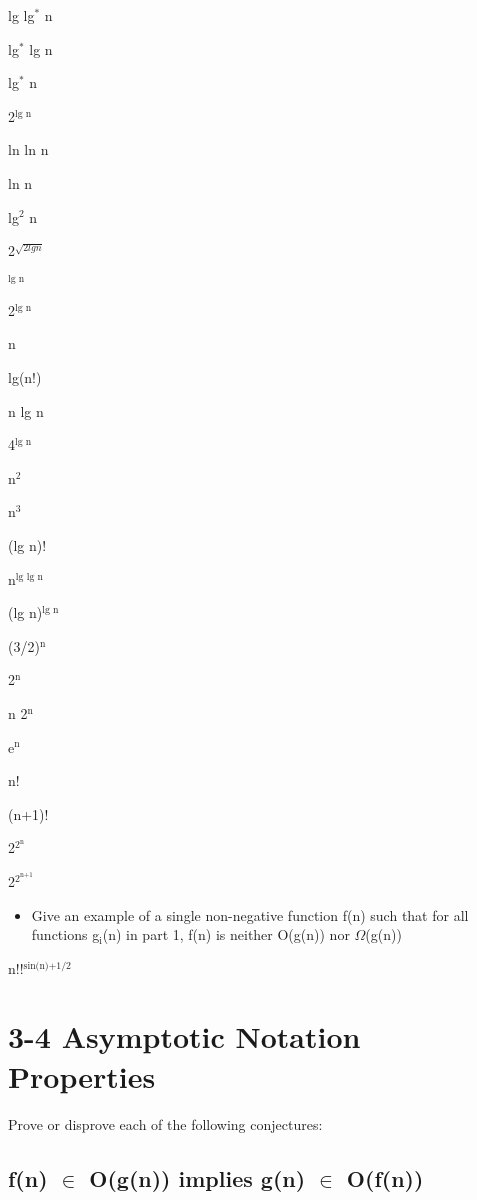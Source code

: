 \documentclass[12pt]{article}
\begin{document}
lg lg$^{\text{*}}$ n

lg$^{\text{*}}$ lg n

lg$^{\text{*}}$ n

2$^{\text{lg n}}$

ln ln n


ln n

lg$^{\text{2}}$ n

2$^{\sqrt{2 lg n}}$


$^{\text{lg n}}$

2$^{\text{lg n}}$

n

lg(n!)

n lg n

4$^{\text{lg n}}$

n$^{\text{2}}$

n$^{\text{3}}$

(lg n)!

n$^{\text{lg lg n}}$

(lg n)$^{\text{lg n}}$

(3/2)$^{\text{n}}$

2$^{\text{n}}$

n 2$^{\text{n}}$

e$^{\text{n}}$

n!

(n+1)!

2$^{\text{2}^{\text{n}}}$

2$^{\text{2}^{\text{n+1}}}$

\begin{itemize}
\item Give an example of a single non-negative function f(n) such that for all
functions g$_{\text{i}}$(n) in part 1, f(n) is neither O(g(n)) nor
$\Omega$(g(n))
\end{itemize}

n!!$^{\text{sin(n)+1/2}}$

\section{3-4 Asymptotic Notation Properties}
\label{sec-3}

Prove or disprove each of the following conjectures:

\subsection{f(n) $\in$ O(g(n)) implies g(n) $\in$ O(f(n))}
\label{sec-3-1}
\end{document}
